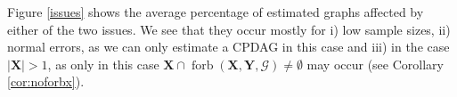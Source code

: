\documentclass[11pt,a4paper]{article}
\theoremstyle{definition}
\theoremstyle{remark}
\DeclareMathOperator{\Forbb}{forb}
\newcommand{\g}[1][G]{\mathcal{#1}}
\newcommand{\fb}[2][X,Y]{\Forbb(\mathbf{#1},#2)}
\begin{document}
Figure \ref{issues} shows the average percentage of estimated graphs affected by either of the two issues. We see that they occur mostly for i) low sample sizes, ii) normal errors, as we can only estimate a CPDAG in this case and iii) in the case $|\mathbf{X}|>1$,  as only in this case $\mathbf{X} \cap \fb{\g} \neq \emptyset$ may occur (see Corollary \ref{cor:noforbx}). 






%



%
%
%
\end{document}
